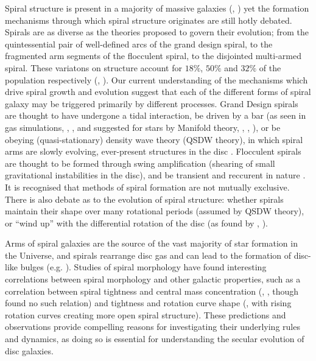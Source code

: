 
Spiral structure is present in a majority of massive galaxies (\citealt{1989gadv.book..151B}, \citealt{2008MNRAS.389.1179L}) yet the formation mechanisms through which spiral structure originates are still hotly debated. Spirals are as diverse as the theories proposed to govern their evolution; from the quintessential pair of well-defined arcs of the grand design spiral, to the fragmented arm segments of the flocculent spiral, to the disjointed multi-armed spiral. These variatons on structure account for $18\%$, $50\%$ and $32\%$ of the population respectively (\citealt{2011ApJ...737...32E}, \citealt{2015yCat..22170032B}). Our current understanding of the mechanisms which drive spiral growth and evolution suggest that each of the different forms of spiral galaxy may be triggered primarily by different processes. Grand Design spirals are thought to have undergone a tidal interaction, be driven by a bar (as seen in gas simulations, \citealt{1976ApJ...209...53S}, \citealt{2008A&A...489..115R}, and suggested for stars by Manifold theory, \citealt{2006A&A...453...39R}, \citealt{2009MNRAS.394...67A}, \citealt{2009MNRAS.400.1706A}), or be obeying (quasi-stationary) density wave theory (QSDW theory), in which spiral arms are slowly evolving, ever-present structures in the disc \citep{1964ApJ...140..646L}. Flocculent spirals are thought to be formed through swing amplification (shearing of small gravitational instabilities in the disc), and be transient and reccurent in nature \citep{1966ApJ...146..810J}. It is recognised that methods of spiral formation are not mutually exclusive. There is also debate as to the evolution of spiral structure: whether spirals maintain their shape over many rotational periods (assumed by QSDW theory), or ``wind up'' with the differential rotation of the disc (as found by \citealt{2003MNRAS.344..358B}, \citealt{2019MNRAS.487.1808M}).

Arms of spiral galaxies are the source of the vast majority of star formation in the Universe, and spirals rearrange disc gas and can lead to the formation of disc-like bulges (e.g. \citealt{2004ARA&A..42..603K}). Studies of spiral morphology have found interesting correlations between spiral morphology and other galactic properties, such as a correlation between spiral tightness and central mass concentration (\citealt{2019ApJ...871..194Y}, \citealt{2015PhDT........14D}, though \citealt{2017MNRAS.472.2263H} found no such relation) and tightness and rotation curve shape (\citealt{2005MNRAS.359.1065S}, with rising rotation curves creating more open spiral structure). These predictions and observations provide compelling reasons for investigating their underlying rules and dynamics, as doing so is essential for understanding the secular evolution of disc galaxies.

